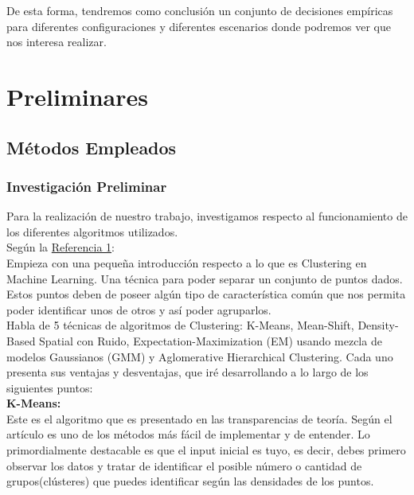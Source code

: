 \documentclass[conference,a4paper]{IEEEtran}
\begin{document}
De esta forma, tendremos como conclusión un conjunto de decisiones empíricas para diferentes configuraciones y diferentes escenarios donde podremos ver que nos interesa realizar.\\


\section{Preliminares}

\subsection{Métodos Empleados}

\subsubsection{Investigación Preliminar}

Para la realización de nuestro trabajo, investigamos respecto al funcionamiento de los diferentes algoritmos utilizados.\\

Según la  \hyperref[bib:georgeSeif]{Referencia 1}: \\ 

Empieza con una pequeña introducción respecto a lo que es Clustering en Machine Learning. Una técnica para poder separar un conjunto de puntos dados. Estos puntos deben de poseer algún tipo de característica común que nos permita poder identificar unos de otros y así poder agruparlos.\\

Habla de 5 técnicas de algoritmos de Clustering: K-Means, Mean-Shift, Density-Based Spatial con Ruido, Expectation-Maximization (EM) usando mezcla de modelos Gaussianos (GMM) y Aglomerative Hierarchical Clustering. Cada uno presenta sus ventajas y desventajas, que iré desarrollando a lo largo de los siguientes puntos:\\

\textbf{K-Means:}\\

Este es el algoritmo que es presentado en las transparencias de teoría. Según el artículo es uno de los métodos más fácil de implementar y de entender. Lo primordialmente destacable es que el input inicial es tuyo, es decir, debes primero observar los datos y tratar de identificar el posible número o cantidad de grupos(clústeres) que puedes identificar según las densidades de los puntos.\\
\end{document}
